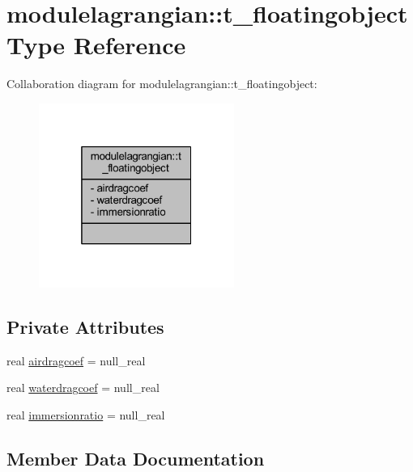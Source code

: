 \hypertarget{structmodulelagrangian_1_1t__floatingobject}{}\section{modulelagrangian\+:\+:t\+\_\+floatingobject Type Reference}
\label{structmodulelagrangian_1_1t__floatingobject}


Collaboration diagram for modulelagrangian\+:\+:t\+\_\+floatingobject\+:\nopagebreak
\begin{figure}[H]
\begin{center}
\leavevmode
\includegraphics[width=181pt]{structmodulelagrangian_1_1t__floatingobject__coll__graph}
\end{center}
\end{figure}
\subsection*{Private Attributes}
\begin{DoxyCompactItemize}
\item 
real \mbox{\hyperlink{structmodulelagrangian_1_1t__floatingobject_ac84ab79692a7719bbb5d13be86062040}{airdragcoef}} = null\+\_\+real
\item 
real \mbox{\hyperlink{structmodulelagrangian_1_1t__floatingobject_aa98f80a916ef1a9169271fa7dc938148}{waterdragcoef}} = null\+\_\+real
\item 
real \mbox{\hyperlink{structmodulelagrangian_1_1t__floatingobject_a86e74c0d30445ff3128b168e01b967e3}{immersionratio}} = null\+\_\+real
\end{DoxyCompactItemize}


\subsection{Member Data Documentation}
\mbox{\label{structmodulelagrangian_1_1t__floatingobject_ac84ab79692a7719bbb5d13be86062040}} 
